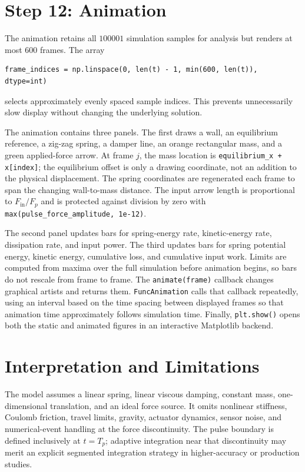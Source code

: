\documentclass[11pt]{article}
\begin{document}
\section{Step 12: Animation}
The animation retains all $100001$ simulation samples for analysis but renders at most $600$ frames. The array
\begin{lstlisting}
frame_indices = np.linspace(0, len(t) - 1, min(600, len(t)), dtype=int)
\end{lstlisting}
selects approximately evenly spaced sample indices. This prevents unnecessarily slow display without changing the underlying solution.

The animation contains three panels. The first draws a wall, an equilibrium reference, a zig-zag spring, a damper line, an orange rectangular mass, and a green applied-force arrow. At frame $j$, the mass location is \texttt{equilibrium\_x + x[index]}; the equilibrium offset is only a drawing coordinate, not an addition to the physical displacement. The spring coordinates are regenerated each frame to span the changing wall-to-mass distance. The input arrow length is proportional to $F_{\mathrm{in}}/F_p$ and is protected against division by zero with \texttt{max(pulse\_force\_amplitude, 1e-12)}.

The second panel updates bars for spring-energy rate, kinetic-energy rate, dissipation rate, and input power. The third updates bars for spring potential energy, kinetic energy, cumulative loss, and cumulative input work. Limits are computed from maxima over the full simulation before animation begins, so bars do not rescale from frame to frame. The \texttt{animate(frame)} callback changes graphical artists and returns them. \texttt{FuncAnimation} calls that callback repeatedly, using an interval based on the time spacing between displayed frames so that animation time approximately follows simulation time. Finally, \texttt{plt.show()} opens both the static and animated figures in an interactive Matplotlib backend.

\section{Interpretation and Limitations}
The model assumes a linear spring, linear viscous damping, constant mass, one-dimensional translation, and an ideal force source. It omits nonlinear stiffness, Coulomb friction, travel limits, gravity, actuator dynamics, sensor noise, and numerical-event handling at the force discontinuity. The pulse boundary is defined inclusively at $t=T_p$; adaptive integration near that discontinuity may merit an explicit segmented integration strategy in higher-accuracy or production studies.
\end{document}
